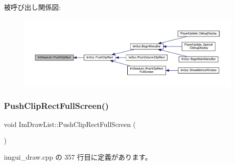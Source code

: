 被呼び出し関係図\+:\nopagebreak
\begin{figure}[H]
\begin{center}
\leavevmode
\includegraphics[width=350pt]{struct_im_draw_list_acb34e2d3708616cae4567f3b4af06962_icgraph}
\end{center}
\end{figure}
\mbox{\label{struct_im_draw_list_a0ab1ab409f0e269755e50a77901bae39}} 
\subsubsection{\texorpdfstring{Push\+Clip\+Rect\+Full\+Screen()}{PushClipRectFullScreen()}}
{\footnotesize\ttfamily void Im\+Draw\+List\+::\+Push\+Clip\+Rect\+Full\+Screen (\begin{DoxyParamCaption}{ }\end{DoxyParamCaption})}



 imgui\+\_\+draw.\+cpp の 357 行目に定義があります。

